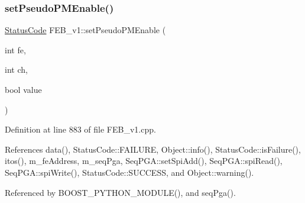 \subsubsection{\texorpdfstring{set\+Pseudo\+P\+M\+Enable()}{setPseudoPMEnable()}}
{\footnotesize\ttfamily \hyperlink{classStatusCode}{Status\+Code} F\+E\+B\+\_\+v1\+::set\+Pseudo\+P\+M\+Enable (\begin{DoxyParamCaption}\item[{int}]{fe,  }\item[{int}]{ch,  }\item[{bool}]{value }\end{DoxyParamCaption})}



Definition at line 883 of file F\+E\+B\+\_\+v1.\+cpp.



References data(), Status\+Code\+::\+F\+A\+I\+L\+U\+RE, Object\+::info(), Status\+Code\+::is\+Failure(), itos(), m\+\_\+fe\+Address, m\+\_\+seq\+Pga, Seq\+P\+G\+A\+::set\+Spi\+Add(), Seq\+P\+G\+A\+::spi\+Read(), Seq\+P\+G\+A\+::spi\+Write(), Status\+Code\+::\+S\+U\+C\+C\+E\+SS, and Object\+::warning().



Referenced by B\+O\+O\+S\+T\+\_\+\+P\+Y\+T\+H\+O\+N\+\_\+\+M\+O\+D\+U\+L\+E(), and seq\+Pga().


